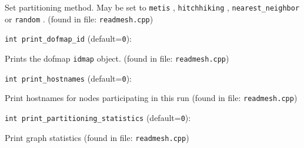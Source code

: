 Set partitioning method. May be set to  \verb+metis+ ,
 \verb+hitchhiking+ ,  \verb+nearest_neighbor+  or  \verb+random+ .
 (found in file: \verb+readmesh.cpp+)
\item\verb+int print_dofmap_id+ {\rm(default=\verb|0|)}:

Prints the dofmap  \verb+idmap+  object. 
 (found in file: \verb+readmesh.cpp+)
\item\verb+int print_hostnames+ {\rm(default=\verb|0|)}:

Print hostnames for nodes participating in this run
 (found in file: \verb+readmesh.cpp+)
\item\verb+int print_partitioning_statistics+ {\rm(default=\verb|0|)}:

Print graph statistics
 (found in file: \verb+readmesh.cpp+)
